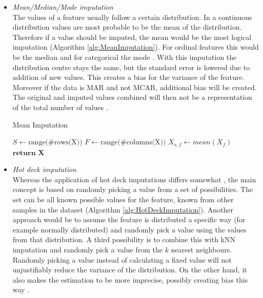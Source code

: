 \documentclass[10pt,a4paper]{report}
\begin{document}
\begin{itemize}
		\item \textit{Mean/Median/Mode imputation} \\
		The values of a feature usually follow a certain distribution. In a continuous distribution values are most probable to be the mean of the distribution. Therefore if a value should be imputed, the mean would be the most logical imputation (Algorithm \ref{alg:MeanImputation}). For ordinal features this would be the median and for categorical the mode \cite{haukoos2007advanced, myrtveit2001analyzing, cartwright2003dealing}. With this imputation the distribution centre stays the same, but the standard error is lowered due to addition of new values. This creates a bias for the variance of the feature. Moreover if the data is MAR and not MCAR, additional bias will be created. The original and imputed values combined will then not be a representation of the total number of values \cite{donders2006gentle, pedersen2017missing}.
		
		\begin{algorithm}[H]
			\caption{Mean Imputation}\label{alg:MeanImputation}
			\begin{algorithmic}[1]
				\State $S \gets \text{range(\#rows(X))}$ 	
				\State $F \gets \text{range(\#columns(X))}$ 	
				 					
				 				 			
				\State $X_{s,f} \gets \textit{mean}(X_f)$	
				\EndIf
				\EndFor
				\State $\textbf{return X}$
				\EndProcedure
			\end{algorithmic}
		\end{algorithm}	
		
		\item \textit{Hot deck imputation} \\
		Whereas the application of hot deck imputations differs somewhat \cite{myrtveit2001analyzing, cartwright2003dealing, haukoos2007advanced}, the main concept is based on randomly picking a value from a set of possibilities. The set can be all known possible values for the feature, known from other samples in the dataset (Algorithm \ref{alg:HotDeckImputation}). Another approach would be to assume the feature is distributed a specific way (for example normally distributed) and randomly pick a value using the values from that distribution. A third possibility is to combine this with kNN imputation and randomly pick a value from the $k$ nearest neighbours. Randomly picking a value instead of calculating a fixed value will not unjustifiably reduce the variance of the distribution. On the other hand, it also makes the estimation to be more imprecise, possibly creating bias this way \cite{haukoos2007advanced}.
		

\end{itemize}
\end{document}
